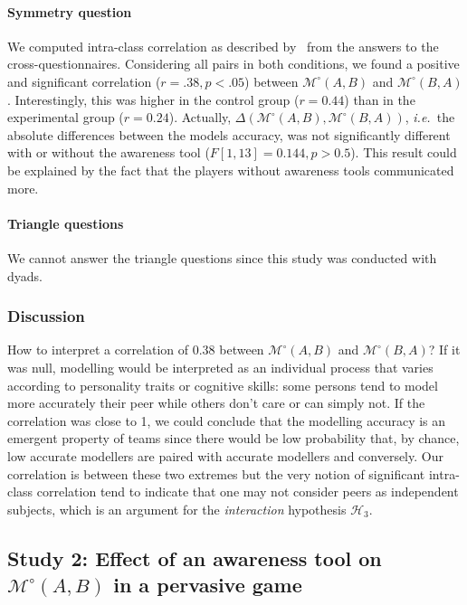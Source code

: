 \documentclass[twocolumn]{article}
\newcommand{\ie}{{\textit{i.e.\ }}}
\newcommand{\gModel}[2]{{$\mathcal{M}^{\circ}(#1, #2)$}}
\newcommand{\gMdeg}[2]{{\mathcal{M}^{\circ}(#1, #2)}}
\begin{document}
\paragraph{Symmetry question} We computed intra-class correlation as described
by~\citep{kenny1998data} from the answers to the cross-questionnaires.
Considering all pairs in both conditions, we found a positive and significant
correlation ($r = .38, p < .05$) between \gModel{A}{B} and \gModel{B}{A}.
Interestingly, this was higher in the control group ($r = 0.44$) than in the
experimental group ($r = 0.24$). Actually, $\Delta(\gMdeg{A}{B},\gMdeg{B}{A})$,
\ie the absolute differences between the models accuracy, was not significantly
different with or without the awareness tool ($F [1,13]= 0.144, p > 0.5$). This
result could be explained by the fact that the players without awareness tools
communicated more.

\paragraph{Triangle questions} We cannot answer the triangle questions since
this study was conducted with dyads.

\subsubsection*{Discussion}

How to interpret a correlation of 0.38 between \gModel{A}{B} and \gModel{B}{A}?
If it was null, modelling would be interpreted as an individual process that
varies according to personality traits or cognitive skills: some persons tend to
model more accurately their peer while others don't care or can simply not. If
the correlation was close to 1, we could conclude that the modelling accuracy is
an emergent property of teams since there would be low probability that, by
chance, low accurate modellers are paired with accurate modellers and
conversely. Our correlation is between these two extremes but the very notion of
significant intra-class correlation tend to indicate that one may not consider
peers as independent subjects, which is an argument for the \emph{interaction}
hypothesis $\mathcal{H}_{3}$. 





\subsection{Study 2: Effect of an awareness tool on \gModel{A}{B}  in a pervasive
game}
\end{document}
